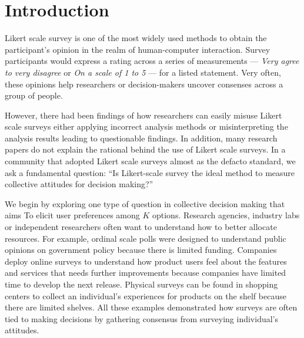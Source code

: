 \section{Introduction}
Likert scale survey 
is one of the most widely used methods
to obtain the participant's opinion
in the realm of human-computer interaction.
Survey participants would express
a rating across a series of measurements ---
\textit{Very agree to very disagree} or
\textit{On a scale of 1 to 5} ---
for a listed statement.
Very often, 
these opinions help
researchers or decision-makers
uncover consenses 
across a group of people.

However, there had been findings of
how researchers can 
easily misuse Likert scale surveys
either applying incorrect analysis methods 
\cite{bishop2015use}
or misinterpreting the analysis results
\cite{jamieson2004likert, pell2005use}
leading to questionable findings.
In addition, 
many research papers
do not explain the rational
behind the use of 
Likert scale surveys.
In a community that adopted Likert scale surveys
almost as the defacto standard,
we ask a fundamental question: 
``Is Likert-scale survey the ideal method
to measure collective attitudes for decision making?''

We begin by exploring one type of question
in collective decision making that aims To
elicit user preferences among $K$ options.
Research agencies, industry labs or independent researchers
often want to understand how to better allocate resources.
For example, 
ordinal scale polls were designed
to understand public opinions
on government policy \cite{pew}
because there is limited funding.
Companies deploy online surveys 
to understand how product users 
feel about the features and services
that needs further improvements
because companies have limited time 
to develop the next release.
Physical surveys can be found 
in shopping centers 
to collect an individual's experiences
for products on the shelf
because there are limited shelves.
All these examples demonstrated
how surveys are often tied to 
making decisions 
by gathering consensus
from surveying individual's attitudes.

